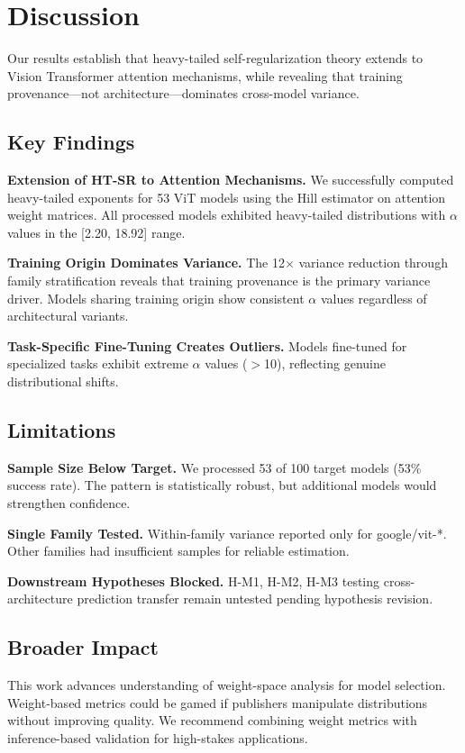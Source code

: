 \section{Discussion}
\label{sec:discussion}

Our results establish that heavy-tailed self-regularization theory extends to Vision Transformer attention mechanisms, while revealing that training provenance---not architecture---dominates cross-model variance.

\subsection{Key Findings}

\textbf{Extension of HT-SR to Attention Mechanisms.} We successfully computed heavy-tailed exponents for 53 ViT models using the Hill estimator on attention weight matrices. All processed models exhibited heavy-tailed distributions with $\alpha$ values in the [2.20, 18.92] range.

\textbf{Training Origin Dominates Variance.} The 12$\times$ variance reduction through family stratification reveals that training provenance is the primary variance driver. Models sharing training origin show consistent $\alpha$ values regardless of architectural variants.

\textbf{Task-Specific Fine-Tuning Creates Outliers.} Models fine-tuned for specialized tasks exhibit extreme $\alpha$ values ($>$10), reflecting genuine distributional shifts.

\subsection{Limitations}

\textbf{Sample Size Below Target.} We processed 53 of 100 target models (53\% success rate). The pattern is statistically robust, but additional models would strengthen confidence.

\textbf{Single Family Tested.} Within-family variance reported only for google/vit-*. Other families had insufficient samples for reliable estimation.

\textbf{Downstream Hypotheses Blocked.} H-M1, H-M2, H-M3 testing cross-architecture prediction transfer remain untested pending hypothesis revision.

\subsection{Broader Impact}

This work advances understanding of weight-space analysis for model selection. Weight-based metrics could be gamed if publishers manipulate distributions without improving quality. We recommend combining weight metrics with inference-based validation for high-stakes applications.

